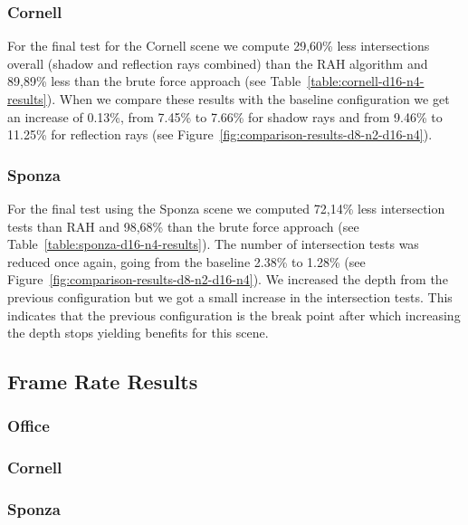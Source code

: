 \subsubsection{Cornell}

For the final test for the Cornell scene we compute 29,60\% less intersections overall (shadow and reflection rays combined) than the RAH algorithm and 89,89\% less than the brute force approach (see Table~\ref{table:cornell-d16-n4-results}). When we compare these results with the baseline configuration we get an increase of 0.13\%, from 7.45\% to 7.66\% for shadow rays and from 9.46\% to 11.25\% for reflection rays (see Figure~\ref{fig:comparison-results-d8-n2-d16-n4}).

\subsubsection{Sponza}

For the final test using the Sponza scene we computed 72,14\% less intersection tests than RAH and 98,68\% than the brute force approach (see Table~\ref{table:sponza-d16-n4-results}). The number of intersection tests was reduced once again, going from the baseline 2.38\% to 1.28\% (see Figure~\ref{fig:comparison-results-d8-n2-d16-n4}). We increased the depth from the previous configuration but we got a small increase in the intersection tests. This indicates that the previous configuration is the break point after which increasing the depth stops yielding benefits for this scene.


\subsection{Frame Rate Results}

\subsubsection{Office}

\subsubsection{Cornell}

\subsubsection{Sponza}

